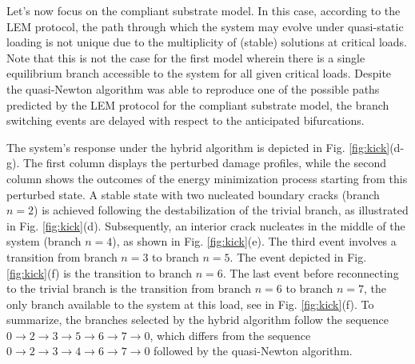 Let's now  focus on the compliant substrate model. In this case, according to the LEM protocol, the path through which the system may evolve under quasi-static loading is not unique due to the multiplicity of (stable) solutions at critical loads.
Note that this is not the case for the first model wherein there is a single equilibrium branch accessible to the system for all given critical loads.
Despite the quasi-Newton algorithm was able to reproduce one of the possible paths predicted by the LEM protocol for the compliant substrate model,  {the branch switching events} {are delayed with respect to the} anticipated bifurcations. 


The system's response under the hybrid algorithm is depicted in Fig. \ref{fig:kick}(d-g). The first column displays the perturbed damage profiles, while the second column shows the outcomes of the energy minimization process starting from  this perturbed state. A stable state with two nucleated boundary cracks (branch \( n=2 \)) is achieved following the destabilization of the trivial branch, as illustrated in Fig. \ref{fig:kick}(d). Subsequently, an interior crack nucleates in the middle of the system (branch \( n=4 \)), as shown in Fig. \ref{fig:kick}(e). The third event involves a transition from branch \( n=3 \) to branch \( n=5 \). The  event depicted in Fig. \ref{fig:kick}(f) is the transition to branch \( n=6 \). The last event before reconnecting to the trivial branch is the transition from branch \( n=6 \) to branch \( n=7 \), the only  branch available to the system at this load, see in Fig. \ref{fig:kick}(f). To summarize, the branches selected by the hybrid algorithm follow the sequence 
\( 0 \rightarrow 2 \rightarrow 3 \rightarrow 5 \rightarrow 6 \rightarrow 7 \rightarrow 0 \), 
which differs from the sequence 
\( 0 \rightarrow 2 \rightarrow 3 \rightarrow 4 \rightarrow 6 \rightarrow 7 \rightarrow 0 \) 
followed by the quasi-Newton algorithm.


